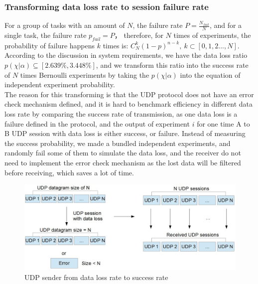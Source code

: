 \documentclass[11pt,openright,a4paper]{report}
\begin{document}
\subsubsection{Transforming data loss rate to session failure rate}
For a group of tasks with an amount of $N$, the failure rate $P=\frac{N_{fail}}{N}$, and for a single task, the failure rate $p_{fail}=P$， therefore, for $N$ times of experiments, the probability of failure happens $k$ times is: $C_{N}^{k}(1-p)^{n-k},\ k \subset [0,1,2...,N]$. According to the discussion in system requirements, we have the data loss ratio $p(\chi | \alpha) \subseteq [2.639\%, 3.448\%] $, and we transform this ratio into the success rate of $N$ times Bernoulli experiments by taking the $p(\chi | \alpha)$ into the equation of independent experiment probability.\\
The reason for this transforming is that the UDP protocol does not have an error check mechanism defined, and it is hard to benchmark efficiency in different data loss rate by comparing the success rate of transmission, as one data loss is a failure defined in the protocol, and the output of experiment $i$ for one time A to B UDP session with data loss is either success, or failure. Instead of measuring the success probability, we made a bundled independent experiments, and randomly fail some of them to simulate the data loss, and the receiver do not need to implement the error check mechanism as the lost data will be filtered before receiving, which saves a lot of time.\\
\begin{figure}[H]
\centering
\includegraphics[width=0.7\linewidth]{picture/udpsender}
\caption{UDP sender from data loss rate to success rate}
\label{fig:udpsender}
\end{figure}
\end{document}
